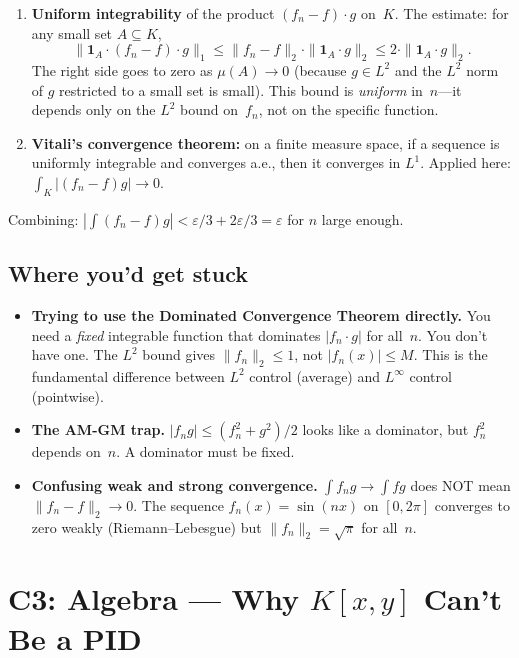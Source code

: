 \begin{enumerate}
\item \textbf{Uniform integrability} of the product $(f_n - f) \cdot g$
  on~$K$. The estimate: for any small set $A \subseteq K$,
  \[
    \|\mathbf{1}_A \cdot (f_n - f) \cdot g\|_1
    \le \|f_n - f\|_2 \cdot \|\mathbf{1}_A \cdot g\|_2
    \le 2 \cdot \|\mathbf{1}_A \cdot g\|_2.
  \]
  The right side goes to zero as $\mu(A) \to 0$ (because $g \in L^2$
  and the $L^2$ norm of $g$ restricted to a small set is small). This
  bound is \emph{uniform} in~$n$---it depends only on the $L^2$ bound
  on~$f_n$, not on the specific function.

\item \textbf{Vitali's convergence theorem:} on a finite measure space,
  if a sequence is uniformly integrable and converges a.e., then it
  converges in $L^1$. Applied here: $\int_K |(f_n - f)g| \to 0$.
\end{enumerate}

Combining: $|\int (f_n - f)g| < \varepsilon/3 + 2\varepsilon/3 =
\varepsilon$ for $n$ large enough.

\section{Where you'd get stuck}

\begin{itemize}
\item \textbf{Trying to use the Dominated Convergence Theorem directly.}
  You need a \emph{fixed} integrable function that dominates $|f_n \cdot
  g|$ for all~$n$. You don't have one. The $L^2$ bound gives
  $\|f_n\|_2 \le 1$, not $|f_n(x)| \le M$. This is the fundamental
  difference between $L^2$ control (average) and $L^\infty$ control
  (pointwise).
\item \textbf{The AM-GM trap.} $|f_n g| \le (f_n^2 + g^2)/2$ looks
  like a dominator, but $f_n^2$ depends on~$n$. A dominator must be
  fixed.
\item \textbf{Confusing weak and strong convergence.} $\int f_n g \to
  \int fg$ does NOT mean $\|f_n - f\|_2 \to 0$. The sequence
  $f_n(x) = \sin(nx)$ on $[0, 2\pi]$ converges to zero weakly
  (Riemann--Lebesgue) but $\|f_n\|_2 = \sqrt{\pi}$ for all~$n$.
\end{itemize}

\chapter{C3: Algebra --- Why $K[x,y]$ Can't Be a PID}\label{ch:lesson-c3}


